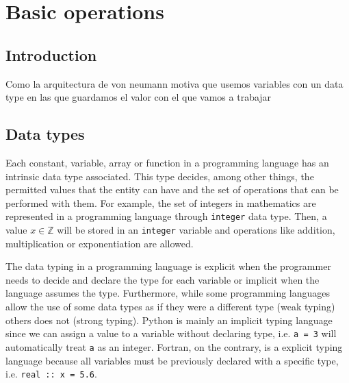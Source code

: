\chapter{Basic operations} \label{chap:basicop}


\section{Introduction} 

Como la arquitectura de von neumann motiva que usemos variables con un data type en las que guardamos el valor con el que vamos a trabajar



\section{Data types} 



Each constant, variable, array or function in a programming language has an intrinsic data type associated. 
This type decides, among other things, the permitted values that the entity can have and the set of operations that can be performed with them.
For example, the set of integers in mathematics are represented in a programming language through \texttt{integer} data type. 
Then, a value $x\in \mathbb{Z}$ will be stored in an \texttt{integer} variable and operations like addition, multiplication or exponentiation are allowed. 

The data typing in a programming language is explicit when the programmer needs to decide and declare the type for each variable or implicit when the language assumes the type. 
Furthermore, while some programming languages allow the use of some data types as if they were a different type (weak typing) others does not (strong typing). 
Python is mainly an implicit typing language since we can assign a value to a variable without declaring type, i.e. \texttt{a = 3} will automatically treat \texttt{a} as an integer. 
Fortran, on the contrary, is a explicit typing language because all variables must be previously declared with a specific type, i.e. \texttt{real :: x = 5.6}.




